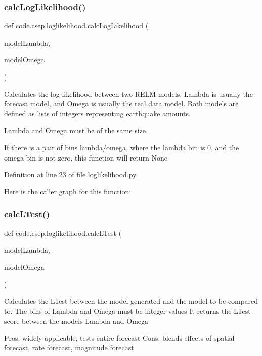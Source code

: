 \subsubsection{\texorpdfstring{calc\+Log\+Likelihood()}{calcLogLikelihood()}}
{\footnotesize\ttfamily def code.\+csep.\+loglikelihood.\+calc\+Log\+Likelihood (\begin{DoxyParamCaption}\item[{}]{model\+Lambda,  }\item[{}]{model\+Omega }\end{DoxyParamCaption})}

\begin{DoxyVerb}Calculates the log likelihood between two RELM models. Lambda is usually
the forecast model, and Omega is usually the real data model. Both models
are defined as lists of integers representing earthquake amounts.

Lambda and Omega must be of the same size.

If there is a pair of bins lambda/omega, where the lambda bin is 0, and the
omega bin is not zero, this function will return None
\end{DoxyVerb}
 

Definition at line 23 of file loglikelihood.\+py.

Here is the caller graph for this function\+:
\mbox{\label{namespacecode_1_1csep_1_1loglikelihood_ab524a28d5897863d3f87a5a12c00ab7a}} 
\subsubsection{\texorpdfstring{calc\+L\+Test()}{calcLTest()}}
{\footnotesize\ttfamily def code.\+csep.\+loglikelihood.\+calc\+L\+Test (\begin{DoxyParamCaption}\item[{}]{model\+Lambda,  }\item[{}]{model\+Omega }\end{DoxyParamCaption})}

\begin{DoxyVerb}Calculates the LTest between the model generated and the model to be compared to.
The bins of Lambda and Omega must be integer values
It returns the LTest score between the models Lambda and Omega

Pros: widely applicable, tests entire forecast
Cons: blends effects of spatial forecast, rate forecast, magnitude forecast
\end{DoxyVerb}
 

